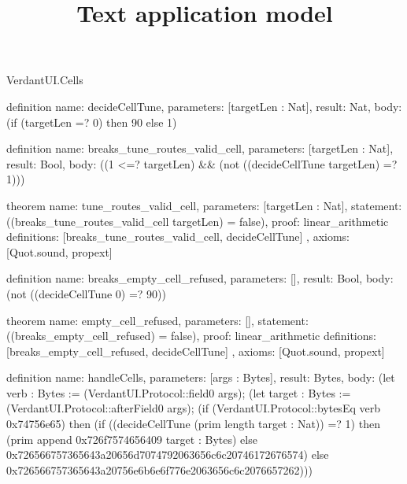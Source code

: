 \begin{lexlean}{VerdantUI.Cells}
\title{Text application model}
\begin{semanticmodule}
definition{
  name: decideCellTune,
  parameters: [targetLen : Nat],
  result: Nat,
  body: (if (targetLen =? 0) then 90 else 1)
}

definition{
  name: breaks_tune_routes_valid_cell,
  parameters: [targetLen : Nat],
  result: Bool,
  body: ((1 <=? targetLen) && (not ((decideCellTune targetLen) =? 1)))
}

theorem{
  name: tune_routes_valid_cell,
  parameters: [targetLen : Nat],
  statement: ((breaks_tune_routes_valid_cell targetLen) = false),
  proof: linear_arithmetic{
    definitions: [breaks_tune_routes_valid_cell, decideCellTune]
  },
  axioms: [Quot.sound, propext]
}

definition{
  name: breaks_empty_cell_refused,
  parameters: [],
  result: Bool,
  body: (not ((decideCellTune 0) =? 90))
}

theorem{
  name: empty_cell_refused,
  parameters: [],
  statement: ((breaks_empty_cell_refused) = false),
  proof: linear_arithmetic{
    definitions: [breaks_empty_cell_refused, decideCellTune]
  },
  axioms: [Quot.sound, propext]
}

definition{
  name: handleCells,
  parameters: [args : Bytes],
  result: Bytes,
  body: (let verb : Bytes := (VerdantUI.Protocol::field0 args);
    (let target : Bytes := (VerdantUI.Protocol::afterField0 args);
    (if (VerdantUI.Protocol::bytesEq verb 0x74756e65) then
      (if ((decideCellTune (prim length target : Nat)) =? 1) then
        (prim append 0x726f7574656409 target : Bytes)
      else 0x726566757365643a20656d7074792063656c6c20746172676574)
    else 0x726566757365643a20756e6b6e6f776e2063656c6c2076657262)))
}
\end{semanticmodule}
\end{lexlean}
